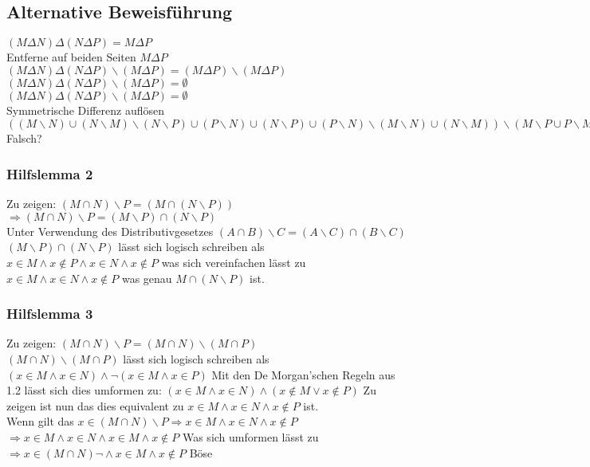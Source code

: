 \subsection{Alternative Beweisführung}
\((M \Delta N) \Delta (N\Delta P) = M \Delta P\) \\
Entferne auf beiden Seiten \( M \Delta P\) \\
\( ( M \Delta N ) \Delta ( N \Delta P ) \backslash ( M \Delta P ) = ( M \Delta P ) \backslash ( M \Delta P ) \) \\
\( ( M \Delta N ) \Delta ( N \Delta P ) \backslash ( M \Delta P ) = \emptyset \) \\
\( ( M \Delta N ) \Delta ( N \Delta P ) \backslash ( M \Delta P ) = \emptyset \) \\
Symmetrische Differenz auflösen
\( ((M \backslash N ) \cup (N \backslash M) \backslash ( N \backslash P ) \cup ( P \backslash N ) 
\cup
( N \backslash P ) \cup ( P \backslash N) \backslash ( M \backslash N ) \cup ( N \backslash M )) 
\backslash ( M \backslash P \cup P \backslash M)
= \emptyset \)
Falsch?

\subsubsection*{Hilfslemma 2}
Zu zeigen: \((M \cap N) \backslash P = (M \cap (N \backslash P))\) \\
\(\Rightarrow (M \cap N) \backslash P = (M \backslash P) \cap (N \backslash P)\) \\
Unter Verwendung des Distributivgesetzes \((A \cap B) \backslash C = (A \backslash C) \cap (B \backslash C) \) \\
\((M \backslash P) \cap (N \backslash P)\) lässt sich logisch schreiben als
\(x \in M \land x \notin P \land x \in N \land x \notin P\) was sich vereinfachen lässt zu \(x \in M \land x \in N \land x \notin P\)
was genau \(M \cap (N \backslash P)\) ist.

\subsubsection*{Hilfslemma 3}
Zu zeigen: \((M \cap N) \backslash P = (M \cap N ) \backslash (M \cap P)\) \\
\((M \cap N ) \backslash (M \cap P)\) lässt sich logisch schreiben als \((x \in M \land x \in N) \land \lnot (x \in M \land x \in P)\)
Mit den De Morgan'schen Regeln aus 1.2 lässt sich dies umformen zu: \((x \in M \land x \in N) \land (x \notin M \lor x \notin P)\)
Zu zeigen ist nun das dies equivalent zu \(x \in M \land x \in N \land x \notin P\) ist. \\
Wenn gilt das \(x \in (M \cap N) \backslash P \Rightarrow x \in M \land x \in N \land x \notin P \)  
\(\Rightarrow x \in M \land x \in N \land x \in M \land x \notin P\)
Was sich umformen lässt zu \(\Rightarrow x \in (M \cap N) \lnot\land x \in M \land x \notin P\) Böse

